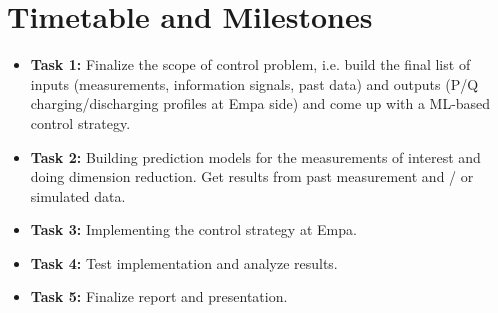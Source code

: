 \documentclass[letterpaper]{scrartcl}
\begin{document}
	\section{Timetable and Milestones}
	
	\begin{itemize}
		\item \textbf{Task 1: } Finalize the scope of control problem, i.e. build the final list of inputs  (measurements, information signals, past data) and outputs (P/Q charging/discharging profiles at Empa side) and 
		come up with a ML-based control strategy.
		\item \textbf{Task 2: } Building prediction models for the measurements of interest and doing dimension reduction. Get results from past measurement and / or simulated data.
		\item \textbf{Task 3: } Implementing the control strategy at Empa.	
		\item \textbf{Task 4: } Test implementation and analyze results.	
		\item \textbf{Task 5: } Finalize report and presentation.
	\end{itemize}
	
	\printbibliography
	
	
\end{document}
